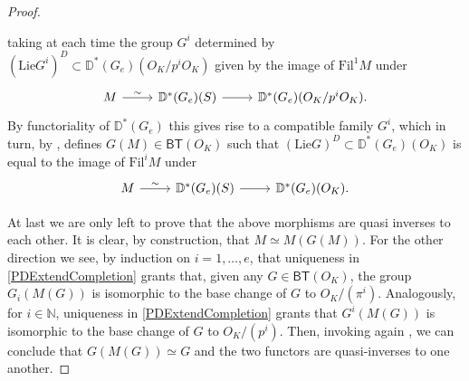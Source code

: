 \begin{proof}
\begin{enumerate}
	taking at each time the group $G^i$ determined by $(\mathrm{Lie} G^i)^D \subset
	\mathbb{D}^*(G_e)(O_K/p^iO_K)$ given by the image of $\mathrm{Fil}^1 M$ under
	\begin{equation*}
	\begin{tikzcd}
		M \arrow[r, "\sim", rightarrow] &
		\mathbb{D}^*(G_e)(S) \arrow[r, "", rightarrow] &
		\mathbb{D}^*(G_e)(O_K/p^iO_K)
	.\end{tikzcd}
	\end{equation*}
	By functoriality of $\mathbb{D}^*(G_e)$ this gives rise to a compatible family $G^i$,
	which in turn, by \cite[Lemma 2.4.4]{deJong}, defines $G(M) \in \mathsf{BT}(O_K)$
	such that $(\mathrm{Lie}G)^D \subset \mathbb{D}^*(G_e)(O_K)$ is
	equal to the image of $\mathrm{Fil}^iM$ under
	\begin{equation*}
	\begin{tikzcd}
		M \arrow[r, "\sim", rightarrow] &
		\mathbb{D}^*(G_e)(S) \arrow[r, "", rightarrow] &
		\mathbb{D}^*(G_e)(O_K)
	.\end{tikzcd}
	\end{equation*}
\end{enumerate}
At last we are only left to prove that the above morphisms are quasi inverses to each other.
It is clear, by construction, that $M \simeq M(G(M))$.
For the other direction we see, by induction on $i = 1, \ldots, e$, that uniqueness in
\cref{PDExtendCompletion} grants that, given any $G \in \mathsf{BT}(O_K)$, 
the group $G_i(M(G))$ is isomorphic to the base change of $G$ to $O_K/ (\pi^i)$.
Analogously, for $i \in \mathbb{N}$, uniqueness in \cref{PDExtendCompletion} grants
that $G^i(M(G))$ is isomorphic to the base change of $G$ to $O_K/ (p^i)$.
Then, invoking again \cite[Lemma 2.4.4]{deJong}, we can conclude that $G(M(G)) \simeq G$
and the two functors are quasi-inverses to one another.
\end{proof}

